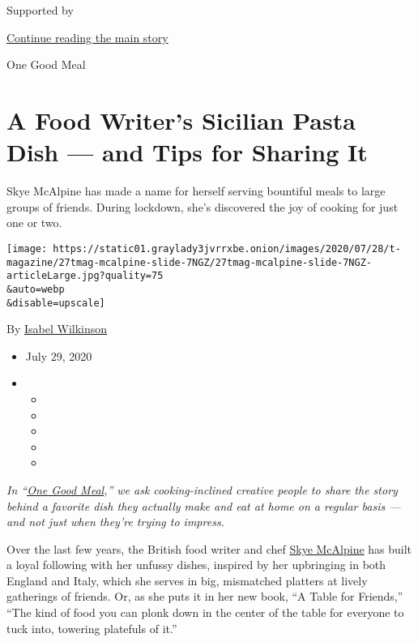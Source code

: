 Supported by

\protect\hyperlink{after-sponsor}{Continue reading the main story}

One Good Meal

\hypertarget{a-food-writers-sicilian-pasta-dish--and-tips-for-sharing-it}{%
\section{A Food Writer's Sicilian Pasta Dish --- and Tips for Sharing
It}\label{a-food-writers-sicilian-pasta-dish--and-tips-for-sharing-it}}

Skye McAlpine has made a name for herself serving bountiful meals to
large groups of friends. During lockdown, she's discovered the joy of
cooking for just one or two.

\texttt{[image: https://static01.graylady3jvrrxbe.onion/images/2020/07/28/t-magazine/27tmag-mcalpine-slide-7NGZ/27tmag-mcalpine-slide-7NGZ-articleLarge.jpg?quality=75\\\&auto=webp\\\&disable=upscale]}

By \href{https://www.nytimes3xbfgragh.onion/by/isabel-wilkinson}{Isabel
Wilkinson}

\begin{itemize}
\item
  July 29, 2020
\item
  \begin{itemize}
  \item
  \item
  \item
  \item
  \item
  \end{itemize}
\end{itemize}

\emph{In
``}\href{https://www.nytimes3xbfgragh.onion/column/one-good-meal}{\emph{One
Good Meal}}\emph{,'' we ask cooking-inclined creative people to share
the story behind a favorite dish they actually make and eat at home on a
regular basis --- and not just when they're trying to impress.}

Over the last few years, the British food writer and chef
\href{https://www.nytimes3xbfgragh.onion/2018/07/02/dining/table-in-venice-book-skye-mcalpine.html}{Skye
McAlpine} has built a loyal following with her unfussy dishes, inspired
by her upbringing in both England and Italy, which she serves in big,
mismatched platters at lively gatherings of friends. Or, as she puts it
in her new book, ``A Table for Friends,'' ``The kind of food you can
plonk down in the center of the table for everyone to tuck into,
towering platefuls of it.''


